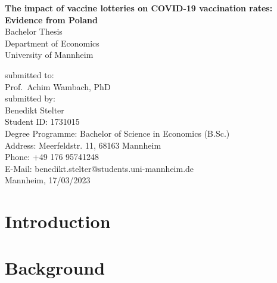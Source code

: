 \documentclass{scrbook}
\begin{document}
	
\frontmatter
\begin{titlepage}

\begin{center}

\vspace*{1,2cm}

\huge {\bfseries The impact of vaccine lotteries on COVID-19 vaccination
rates: Evidence from Poland}\\[1.8cm]

\Large {Bachelor Thesis}\\[1cm]

\large {Department of Economics}\\[0.2cm]

\large {University of Mannheim}\\[0.5cm]

\end{center}

\vfill

\noindent submitted to:\\
Prof.~Achim Wambach, PhD\\[1cm]
submitted by:\\
Benedikt Stelter\\[1cm]
Student ID: 1731015\\
Degree Programme: Bachelor of Science in Economics (B.Sc.)\\[1cm]
Address: Meerfeldstr. 11, 68163 Mannheim\\
Phone: +49 176 95741248\\
E-Mail: benedikt.stelter@students.uni-mannheim.de\\[1cm]
Mannheim, 17/03/2023

\setcounter{page}{0}

\end{titlepage}

  \tableofcontents


\listoffigures

\listoftables


\mainmatter

\chapter{Introduction}

\newpage\null\thispagestyle{empty}\newpage

\chapter{Background}
\end{document}
